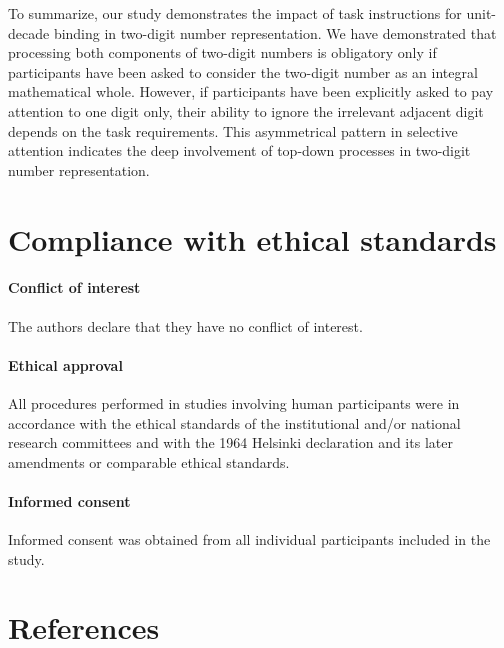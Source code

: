 \documentclass[english,man]{apa6}
\newcounter{author}
\theoremstyle{definition}
\theoremstyle{definition}
\theoremstyle{definition}
\theoremstyle{remark}
\begin{document}
To summarize, our study demonstrates the impact of task instructions for
unit-decade binding in two-digit number representation. We have
demonstrated that processing both components of two-digit numbers is
obligatory only if participants have been asked to consider the
two-digit number as an integral mathematical whole. However, if
participants have been explicitly asked to pay attention to one digit
only, their ability to ignore the irrelevant adjacent digit depends on
the task requirements. This asymmetrical pattern in selective attention
indicates the deep involvement of top-down processes in two-digit number
representation.

\section{Compliance with ethical
standards}\label{compliance-with-ethical-standards}

\paragraph{Conflict of interest}\label{conflict-of-interest}

The authors declare that they have no conflict of interest.

\paragraph{Ethical approval}\label{ethical-approval}

All procedures performed in studies involving human participants were in
accordance with the ethical standards of the institutional and/or
national research committees and with the 1964 Helsinki declaration and
its later amendments or comparable ethical standards.

\paragraph{Informed consent}\label{informed-consent}

Informed consent was obtained from all individual participants included
in the study.

\newpage

\section{References}\label{references}

\setlength{\parindent}{-0.5in} \setlength{\leftskip}{0.5in}
\end{document}
